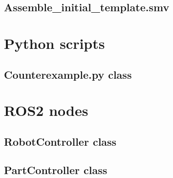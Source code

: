 \subsection{Assemble\_initial\_template.smv}
\label{ch:globalTemplate}


\newpage
\section{Python scripts}
\subsection{Counterexample.py class}
\label{ch:counterexamplePy}


\newpage
\section{ROS2 nodes}
% 
% 
\subsection{RobotController class}
\label{lst:RobotController}


\newpage
\subsection{PartController class}
\label{lst:PartController}


